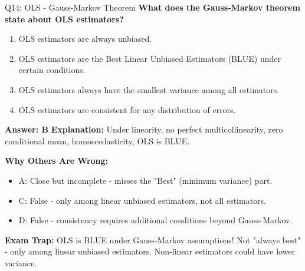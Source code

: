 \documentclass[8pt]{beamer}
\begin{document}
	\begin{frame}{Q14: OLS - Gauss-Markov Theorem}
		\fontsize{6.5}{7.5}\selectfont
		\textbf{What does the Gauss-Markov theorem state about OLS estimators?}
		
		\begin{enumerate}
			\item OLS estimators are always unbiased.
			\item OLS estimators are the Best Linear Unbiased Estimators (BLUE) under certain conditions.
			\item OLS estimators always have the smallest variance among all estimators.
			\item OLS estimators are consistent for any distribution of errors.
		\end{enumerate}
		
		\vspace{0.05cm}
		\textcolor{myblue}{\textbf{Answer: B}}
		\vspace{0.05cm}
		\textcolor{myblue}{\textbf{Explanation:}} Under linearity, no perfect multicollinearity, zero conditional mean, homoscedasticity, OLS is BLUE.
		
		\vspace{0.05cm}
		\textcolor{myred}{\textbf{Why Others Are Wrong:}}
		\begin{itemize}
			\item \textcolor{myred}{A:} Close but incomplete - misses the "Best" (minimum variance) part.
			\item \textcolor{myred}{C:} False - only among linear unbiased estimators, not all estimators.
			\item \textcolor{myred}{D:} False - consistency requires additional conditions beyond Gauss-Markov.
		\end{itemize}
		
		\textcolor{myred}{\textbf{Exam Trap:}} OLS is \textcolor{myblue}{BLUE} under Gauss-Markov assumptions! Not "always best" - only among linear unbiased estimators. Non-linear estimators could have lower variance.
	\end{frame}
	
\end{document}
